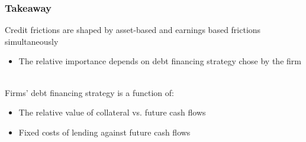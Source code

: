 \documentclass[notes]{beamer}
\begin{document}
\begin{frame}[label=slide2]
\frametitle{Takeaway}

Credit frictions are shaped by asset-based and earnings based frictions simultaneously
\begin{itemize}
    \item The relative importance depends on debt financing strategy chose by the firm
\end{itemize} \vspace{3mm} \\

Firms' debt financing strategy is a function of:
\begin{itemize}
    \item The relative value of collateral vs. future cash flows
    \item Fixed costs of lending against future cash flows
\end{itemize}


\end{frame}
\end{document}
